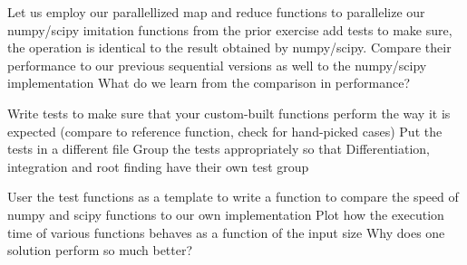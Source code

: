 \documentclass[]{erlangen-problemset}
\begin{document}
\begin{problem}[title={Parallel numpy/scipy replacement}]
\noindent
\Question Let us employ our parallellized map and reduce functions to parallelize our numpy/scipy imitation functions from the prior exercise
\Question add tests to make sure, the operation is identical to the result obtained by numpy/scipy.
\Question Compare their performance to our previous sequential versions as well to the numpy/scipy implementation
\Question What do we learn from the comparison in performance?
\end{problem}

\begin{problem}[title={Adding tests to ensure correctness}]
\noindent
\Question Write tests to make sure that your custom-built functions perform the way it is expected (compare to reference function, check for hand-picked cases)
\Question Put the tests in a different file
\Question Group the tests appropriately so that Differentiation, integration and root finding have their own test group
\end{problem}

\begin{problem}[title={Measuring performance}]
\noindent
\Question User the test functions as a template to write a function to compare the speed of numpy and scipy functions to our own implementation
\Question Plot how the execution time of various functions behaves as a function of the input size
\Question Why does one solution perform so much better?
\end{problem}
\end{document}
